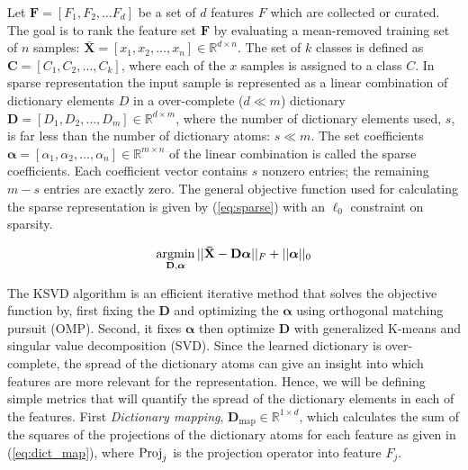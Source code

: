     
    
    
    
    
    Let $\mathbf{F} = [F_1, F_2, \dots F_d]$ be a set of $d$ features $F$ which are collected or curated. The goal is to rank the feature set $\mathbf{F}$ by evaluating a mean-removed training set of $n$ samples: $\mathbf{\bar{X}} = [x_1, x_2, \dots, x_n] \in \mathbb{R}^{d \times n}$. The set of $k$ classes is defined as $\mathbf{C} = [C_1, C_2, \dots, C_k]$, where each of the $x$ samples is assigned to a class $C$. In sparse representation the input sample is represented as a linear combination of dictionary elements $D$ in a over-complete ($d \ll m$) dictionary $\mathbf{D} = [D_1, D_2, \dots, D_m] \in \mathbb{R}^{d \times m}$, where the number of dictionary elements used, $s$, is far less than the number of dictionary atoms: $s \ll m$. The set coefficients $\bm{\alpha} = [\alpha_1, \alpha_2, \dots, \alpha_n] \in \mathbb{R}^{m \times n}$ of the linear combination is called the sparse coefficients. Each coefficient vector contains $s$ nonzero entries; the remaining $m-s$ entries are exactly zero. The general objective function used for calculating the sparse representation is given by (\ref{eq:sparse}) with an $\ell_0$ constraint on sparsity.
    
    \begin{equation}
        \label{eq:sparse}
        \operatorname*{argmin}_{\mathbf{D},\bm{\alpha}} ||\mathbf{\bar{X}}- \mathbf{D}\bm{\alpha}||_F + ||\bm{\alpha}||_0
    \end{equation}
    
    The KSVD algorithm is an efficient iterative method that solves the objective function by, first fixing the $\mathbf{D}$ and optimizing the $\bm{\alpha}$ using orthogonal matching pursuit (OMP)\cite{Pati1993}. Second, it fixes $\bm{\alpha}$ then optimize $\mathbf{D}$ with generalized K-means and singular value decomposition (SVD). Since the learned dictionary is over-complete, the spread of the dictionary atoms can give an insight into which features are more relevant for the representation. Hence, we will be defining simple metrics that will quantify the spread of the dictionary elements in each of the features. First \emph{Dictionary mapping}, $\mathbf{D}_\textrm{map} \in \mathbb{R}^{1 \times d}$, which calculates the sum of the squares of the projections of the dictionary atoms for each feature as given in (\ref{eq:dict_map}), where $\operatorname*{Proj}_j$ is the projection operator into feature $F_j$. 
    
    
